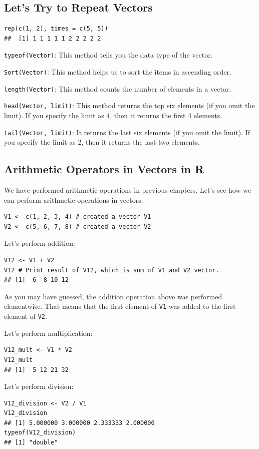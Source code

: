 \documentclass[12pt]{book}
\begin{document}
\subsection{Let’s Try to Repeat Vectors}
\begin{verbatim}
rep(c(1, 2), times = c(5, 5))
##  [1] 1 1 1 1 1 2 2 2 2 2
\end{verbatim}

\texttt{typeof(Vector)}: This method tells you the data type of the vector.

\texttt{Sort(Vector)}: This method helps us to sort the items in ascending order.

\texttt{length(Vector)}: This method counts the number of elements in a vector.

\texttt{head(Vector, limit)}: This method returns the top six elements (if you omit the limit). If you specify the limit as 4, then it returns the first 4 elements.

\texttt{tail(Vector, limit)}: It returns the last six elements (if you omit the limit). If you specify the limit as 2, then it returns the last two elements.

\subsection{Arithmetic Operators in Vectors in R}

We have performed arithmetic operations in previous chapters. Let’s see how we can perform arithmetic operations in vectors.

\begin{verbatim}
V1 <- c(1, 2, 3, 4) # created a vector V1 
V2 <- c(5, 6, 7, 8) # created a vector V2
\end{verbatim}

Let's perform addition:
\begin{verbatim}
V12 <- V1 + V2
V12 # Print result of V12, which is sum of V1 and V2 vector.
## [1]  6  8 10 12
\end{verbatim}

As you may have guessed, the addition operation above was performed elementwise. That means that the first element of \texttt{V1} was added to the first element of \texttt{V2}.

Let’s perform multiplication:
\begin{verbatim}
V12_mult <- V1 * V2
V12_mult
## [1]  5 12 21 32
\end{verbatim}

Let’s perform division:
\begin{verbatim}
V12_division <- V2 / V1
V12_division
## [1] 5.000000 3.000000 2.333333 2.000000
typeof(V12_division)
## [1] "double"
\end{verbatim}
\end{document}
